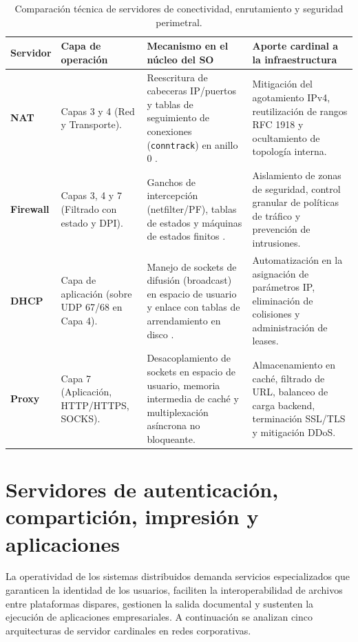 \documentclass[12pt]{article}
\begin{document}
\begin{table}[H]
\centering
\small
\renewcommand{\arraystretch}{1.15}
\renewcommand{\tabularxcolumn}[1]{m{#1}}
\setlength{\emergencystretch}{1.5em}
\caption{Comparación técnica de servidores de conectividad, enrutamiento y seguridad perimetral.}
\label{tab:comparativaServidoresSeguridad}
\begin{tabularx}{\textwidth}{>{\centering\arraybackslash}m{2.5cm} X X X}
\toprule
\textbf{Servidor} & \textbf{Capa de operación} & \textbf{Mecanismo en el núcleo del SO} & \textbf{Aporte cardinal a la infraestructura} \\
\midrule
\textbf{NAT} & Capas 3 y 4 (Red y Transporte). & Reescritura de cabeceras IP/puertos y tablas de seguimiento de conexiones (\texttt{conntrack}) en anillo 0 \parencite[\S 1, p.\ 2]{rfc3022}. & Mitigación del agotamiento IPv4, reutilización de rangos RFC 1918 y ocultamiento de topología interna. \\
\addlinespace
\textbf{Firewall} & Capas 3, 4 y 7 (Filtrado con estado y DPI). & Ganchos de intercepción (netfilter/PF), tablas de estados y máquinas de estados finitos \parencite[\S 19.3, p.\ 943]{deitel2004operating}. & Aislamiento de zonas de seguridad, control granular de políticas de tráfico y prevención de intrusiones. \\
\addlinespace
\textbf{DHCP} & Capa de aplicación (sobre UDP 67/68 en Capa 4). & Manejo de sockets de difusión (broadcast) en espacio de usuario y enlace con tablas de arrendamiento en disco \parencite[\S 1, p.\ 3]{rfc2131}. & Automatización en la asignación de parámetros IP, eliminación de colisiones y administración de leases. \\
\addlinespace
\textbf{Proxy} & Capa 7 (Aplicación, HTTP/HTTPS, SOCKS). & Desacoplamiento de sockets en espacio de usuario, memoria intermedia de caché y multiplexación asíncrona no bloqueante. & Almacenamiento en caché, filtrado de URL, balanceo de carga backend, terminación SSL/TLS y mitigación DDoS. \\
\bottomrule
\end{tabularx}
\end{table}

\section{Servidores de autenticación, compartición, impresión y aplicaciones}
\label{sec:servidoresAutenticacionComparticion}

La operatividad de los sistemas distribuidos demanda servicios especializados que garanticen la identidad de los usuarios, faciliten la interoperabilidad de archivos entre plataformas dispares, gestionen la salida documental y sustenten la ejecución de aplicaciones empresariales. A continuación se analizan cinco arquitecturas de servidor cardinales en redes corporativas.
\end{document}
